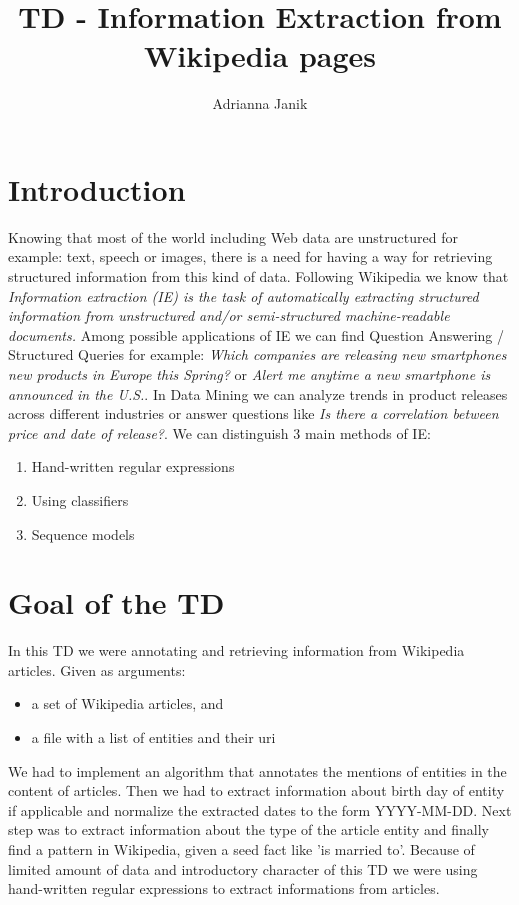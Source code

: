 \documentclass[a4paper]{article}
\title{TD - Information Extraction from Wikipedia pages}
\author{Adrianna Janik}
\begin{document}
\maketitle

\section{Introduction}
Knowing that most of the world including Web data are unstructured for example: text, speech or images, there is a need for having a way for retrieving structured information from this kind of data. Following Wikipedia we know that \textit{Information extraction (IE) is the task of automatically extracting structured information from unstructured and/or semi-structured machine-readable documents.} Among possible applications of IE we can find Question Answering / Structured Queries
for example: \textit{Which companies are releasing new smartphones new products in Europe this Spring?} or \textit{Alert me anytime a new smartphone is announced in the U.S.}. In Data Mining we can analyze trends in product releases across different industries or answer questions like \textit{Is there a correlation between price and date of release?}. We can distinguish 3 main methods of IE: 
\begin{enumerate}
\item Hand-written regular expressions
\item Using classifiers
\item Sequence models
\end{enumerate}
\cite{slides}

\section{Goal of the TD}
In this TD we were annotating and retrieving information from Wikipedia articles. Given as arguments:
\begin{itemize}
	\item a set of Wikipedia articles, and
	\item a file with a list of entities and their uri 
\end{itemize}

We had to implement an algorithm that annotates the mentions of entities in the content of articles. Then we had to extract information about birth day of entity if applicable and normalize the extracted dates to the form YYYY-MM-DD. Next step was to extract information about the type of the article entity and finally find a pattern in Wikipedia, given a seed fact like 'is married to'. Because of limited amount of data and introductory character of this TD we were using hand-written regular expressions to extract informations from articles.
\end{document}
